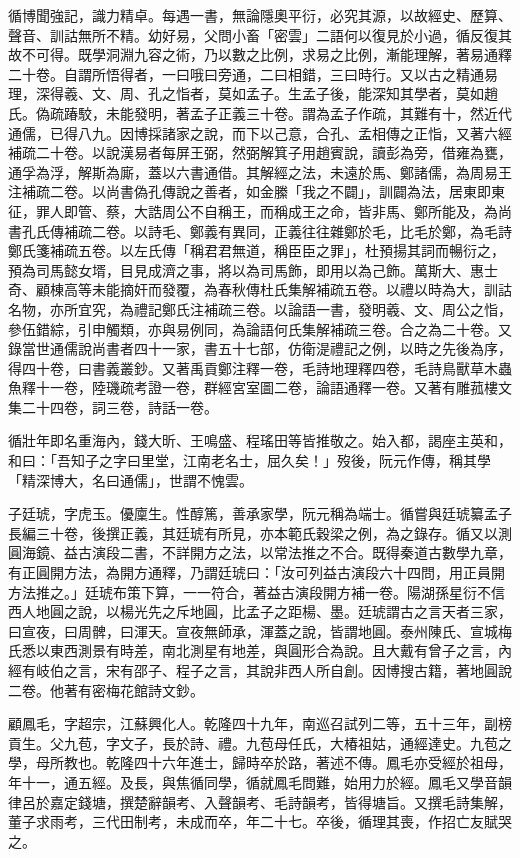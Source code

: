 \begin{pinyinscope}
循博聞強記，識力精卓。每遇一書，無論隱奧平衍，必究其源，以故經史、歷算、聲音、訓詁無所不精。幼好易，父問小畜「密雲」二語何以復見於小過，循反復其故不可得。既學洞淵九容之術，乃以數之比例，求易之比例，漸能理解，著易通釋二十卷。自謂所悟得者，一曰哦曰旁通，二曰相錯，三曰時行。又以古之精通易理，深得羲、文、周、孔之恉者，莫如孟子。生孟子後，能深知其學者，莫如趙氏。偽疏踳駮，未能發明，著孟子正義三十卷。謂為孟子作疏，其難有十，然近代通儒，已得八九。因博採諸家之說，而下以己意，合孔、孟相傳之正恉，又著六經補疏二十卷。以說漢易者每屏王弼，然弼解箕子用趙賓說，讀彭為旁，借雍為甕，通孚為浮，解斯為廝，蓋以六書通借。其解經之法，未遠於馬、鄭諸儒，為周易王注補疏二卷。以尚書偽孔傳說之善者，如金縢「我之不闢」，訓闢為法，居東即東征，罪人即管、蔡，大誥周公不自稱王，而稱成王之命，皆非馬、鄭所能及，為尚書孔氏傳補疏二卷。以詩毛、鄭義有異同，正義往往雜鄭於毛，比毛於鄭，為毛詩鄭氏箋補疏五卷。以左氏傳「稱君君無道，稱臣臣之罪」，杜預揚其詞而暢衍之，預為司馬懿女壻，目見成濟之事，將以為司馬飾，即用以為己飾。萬斯大、惠士奇、顧棟高等未能摘奸而發覆，為春秋傳杜氏集解補疏五卷。以禮以時為大，訓詁名物，亦所宜究，為禮記鄭氏注補疏三卷。以論語一書，發明羲、文、周公之恉，參伍錯綜，引申觸類，亦與易例同，為論語何氏集解補疏三卷。合之為二十卷。又錄當世通儒說尚書者四十一家，書五十七部，仿衛湜禮記之例，以時之先後為序，得四十卷，曰書義叢鈔。又著禹貢鄭注釋一卷，毛詩地理釋四卷，毛詩鳥獸草木蟲魚釋十一卷，陸璣疏考證一卷，群經宮室圖二卷，論語通釋一卷。又著有雕菰樓文集二十四卷，詞三卷，詩話一卷。

循壯年即名重海內，錢大昕、王鳴盛、程瑤田等皆推敬之。始入都，謁座主英和，和曰：「吾知子之字曰里堂，江南老名士，屈久矣！」歿後，阮元作傳，稱其學「精深博大，名曰通儒」，世謂不愧雲。

子廷琥，字虎玉。優廩生。性醇篤，善承家學，阮元稱為端士。循嘗與廷琥纂孟子長編三十卷，後撰正義，其廷琥有所見，亦本範氏穀梁之例，為之錄存。循又以測圓海鏡、益古演段二書，不詳開方之法，以常法推之不合。既得秦道古數學九章，有正圓開方法，為開方通釋，乃謂廷琥曰：「汝可列益古演段六十四問，用正員開方法推之。」廷琥布策下算，一一符合，著益古演段開方補一卷。陽湖孫星衍不信西人地圓之說，以楊光先之斥地圓，比孟子之距楊、墨。廷琥謂古之言天者三家，曰宣夜，曰周髀，曰渾天。宣夜無師承，渾蓋之說，皆謂地圓。泰州陳氏、宣城梅氏悉以東西測景有時差，南北測星有地差，與圓形合為說。且大戴有曾子之言，內經有岐伯之言，宋有邵子、程子之言，其說非西人所自創。因博搜古籍，著地圓說二卷。他著有密梅花館詩文鈔。

顧鳳毛，字超宗，江蘇興化人。乾隆四十九年，南巡召試列二等，五十三年，副榜貢生。父九苞，字文子，長於詩、禮。九苞母任氏，大椿祖姑，通經達史。九苞之學，母所教也。乾隆四十六年進士，歸時卒於路，著述不傳。鳳毛亦受經於祖母，年十一，通五經。及長，與焦循同學，循就鳳毛問難，始用力於經。鳳毛又學音韻律呂於嘉定錢塘，撰楚辭韻考、入聲韻考、毛詩韻考，皆得塘旨。又撰毛詩集解，董子求雨考，三代田制考，未成而卒，年二十七。卒後，循理其喪，作招亡友賦哭之。


\end{pinyinscope}
